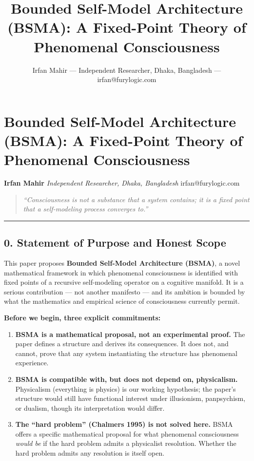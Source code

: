 \documentclass[
  11pt,
  a4paper,
]{article}
\title{Bounded Self-Model Architecture (BSMA): A Fixed-Point Theory of
Phenomenal Consciousness}
\author{Irfan Mahir --- Independent Researcher, Dhaka, Bangladesh ---
irfan@furylogic.com}
\date{}
\providecommand{\tightlist}{%
  \setlength{\itemsep}{0pt}\setlength{\parskip}{0pt}}
\begin{document}
\maketitle

{
\hypersetup{linkcolor=}
\setcounter{tocdepth}{3}
\tableofcontents
}
\section{Bounded Self-Model Architecture (BSMA): A Fixed-Point Theory of
Phenomenal
Consciousness}\label{bounded-self-model-architecture-bsma-a-fixed-point-theory-of-phenomenal-consciousness}

\textbf{Irfan Mahir} \emph{Independent Researcher, Dhaka, Bangladesh}
irfan@furylogic.com

\begin{quote}
\emph{``Consciousness is not a substance that a system contains; it is a
fixed point that a self-modeling process converges to.''}
\end{quote}

\begin{center}\rule{0.5\linewidth}{0.5pt}\end{center}

\subsection{0. Statement of Purpose and Honest
Scope}\label{statement-of-purpose-and-honest-scope}

This paper proposes \textbf{Bounded Self-Model Architecture (BSMA)}, a
novel mathematical framework in which phenomenal consciousness is
identified with fixed points of a recursive self-modeling operator on a
cognitive manifold. It is a serious contribution --- not another
manifesto --- and its ambition is bounded by what the mathematics and
empirical science of consciousness currently permit.

\textbf{Before we begin, three explicit commitments:}

\begin{enumerate}
\def\labelenumi{\arabic{enumi}.}
\tightlist
\item
  \textbf{BSMA is a mathematical proposal, not an experimental proof.}
  The paper defines a structure and derives its consequences. It does
  not, and cannot, prove that any system instantiating the structure has
  phenomenal experience.
\item
  \textbf{BSMA is compatible with, but does not depend on, physicalism.}
  Physicalism (everything is physics) is our working hypothesis; the
  paper's structure would still have functional interest under
  illusionism, panpsychism, or dualism, though its interpretation would
  differ.
\item
  \textbf{The ``hard problem'' (Chalmers 1995) is not solved here.} BSMA
  offers a specific mathematical proposal for what phenomenal
  consciousness \emph{would be} if the hard problem admits a physicalist
  resolution. Whether the hard problem admits any resolution is itself
  open.
\end{enumerate}
\end{document}
